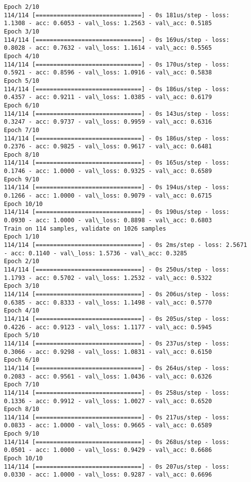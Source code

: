 \documentclass[11pt]{article}
\begin{document}
\begin{Verbatim}[commandchars=\\\{\}]
Epoch 2/10
114/114 [==============================] - 0s 181us/step - loss: 1.1308 - acc: 0.6053 - val\_loss: 1.2563 - val\_acc: 0.5185
Epoch 3/10
114/114 [==============================] - 0s 169us/step - loss: 0.8028 - acc: 0.7632 - val\_loss: 1.1614 - val\_acc: 0.5565
Epoch 4/10
114/114 [==============================] - 0s 170us/step - loss: 0.5921 - acc: 0.8596 - val\_loss: 1.0916 - val\_acc: 0.5838
Epoch 5/10
114/114 [==============================] - 0s 186us/step - loss: 0.4357 - acc: 0.9211 - val\_loss: 1.0385 - val\_acc: 0.6179
Epoch 6/10
114/114 [==============================] - 0s 143us/step - loss: 0.3247 - acc: 0.9737 - val\_loss: 0.9959 - val\_acc: 0.6316
Epoch 7/10
114/114 [==============================] - 0s 186us/step - loss: 0.2376 - acc: 0.9825 - val\_loss: 0.9617 - val\_acc: 0.6481
Epoch 8/10
114/114 [==============================] - 0s 165us/step - loss: 0.1746 - acc: 1.0000 - val\_loss: 0.9325 - val\_acc: 0.6589
Epoch 9/10
114/114 [==============================] - 0s 194us/step - loss: 0.1266 - acc: 1.0000 - val\_loss: 0.9079 - val\_acc: 0.6715
Epoch 10/10
114/114 [==============================] - 0s 190us/step - loss: 0.0930 - acc: 1.0000 - val\_loss: 0.8898 - val\_acc: 0.6803
Train on 114 samples, validate on 1026 samples
Epoch 1/10
114/114 [==============================] - 0s 2ms/step - loss: 2.5671 - acc: 0.1140 - val\_loss: 1.5736 - val\_acc: 0.3285
Epoch 2/10
114/114 [==============================] - 0s 250us/step - loss: 1.1793 - acc: 0.5702 - val\_loss: 1.2532 - val\_acc: 0.5322
Epoch 3/10
114/114 [==============================] - 0s 206us/step - loss: 0.6385 - acc: 0.8333 - val\_loss: 1.1498 - val\_acc: 0.5770
Epoch 4/10
114/114 [==============================] - 0s 205us/step - loss: 0.4226 - acc: 0.9123 - val\_loss: 1.1177 - val\_acc: 0.5945
Epoch 5/10
114/114 [==============================] - 0s 237us/step - loss: 0.3066 - acc: 0.9298 - val\_loss: 1.0831 - val\_acc: 0.6150
Epoch 6/10
114/114 [==============================] - 0s 264us/step - loss: 0.2083 - acc: 0.9561 - val\_loss: 1.0436 - val\_acc: 0.6326
Epoch 7/10
114/114 [==============================] - 0s 258us/step - loss: 0.1336 - acc: 0.9912 - val\_loss: 1.0027 - val\_acc: 0.6520
Epoch 8/10
114/114 [==============================] - 0s 217us/step - loss: 0.0833 - acc: 1.0000 - val\_loss: 0.9665 - val\_acc: 0.6589
Epoch 9/10
114/114 [==============================] - 0s 268us/step - loss: 0.0501 - acc: 1.0000 - val\_loss: 0.9429 - val\_acc: 0.6686
Epoch 10/10
114/114 [==============================] - 0s 207us/step - loss: 0.0330 - acc: 1.0000 - val\_loss: 0.9287 - val\_acc: 0.6696

\end{Verbatim}
\end{document}
